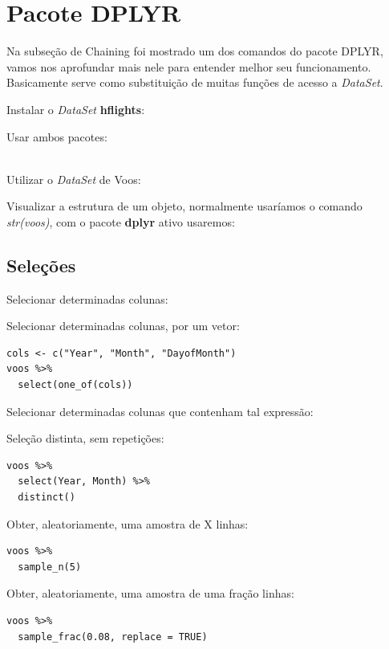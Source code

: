 \documentclass[a4paper,11pt]{article}
\begin{document}
\section{Pacote DPLYR}
Na subseção de Chaining foi mostrado um dos comandos do pacote DPLYR, vamos nos aprofundar mais nele para entender melhor seu funcionamento. Basicamente serve como substituição de muitas funções de acesso a \textit{DataSet}. 

Instalar o \textit{DataSet} \textbf{hflights}: \\

Usar ambos pacotes: \\
 \\

Utilizar o \textit{DataSet} de Voos: \\

Visualizar a estrutura de um objeto, normalmente usaríamos o comando \textit{str(voos)}, com o pacote \textbf{dplyr} ativo usaremos: \\

\subsection{Seleções}
Selecionar determinadas colunas: \\

Selecionar determinadas colunas, por um vetor:
\begin{lstlisting}
cols <- c("Year", "Month", "DayofMonth")
voos %>% 
  select(one_of(cols))
\end{lstlisting}

Selecionar determinadas colunas que contenham tal expressão: \\

Seleção distinta, sem repetições:
\begin{lstlisting}
voos %>% 
  select(Year, Month) %>%
  distinct()
\end{lstlisting}

Obter, aleatoriamente, uma amostra de X linhas:
\begin{lstlisting}
voos %>%
  sample_n(5)
\end{lstlisting}

Obter, aleatoriamente, uma amostra de uma fração linhas:
\begin{lstlisting}
voos %>%
  sample_frac(0.08, replace = TRUE)
\end{lstlisting}
\end{document}
